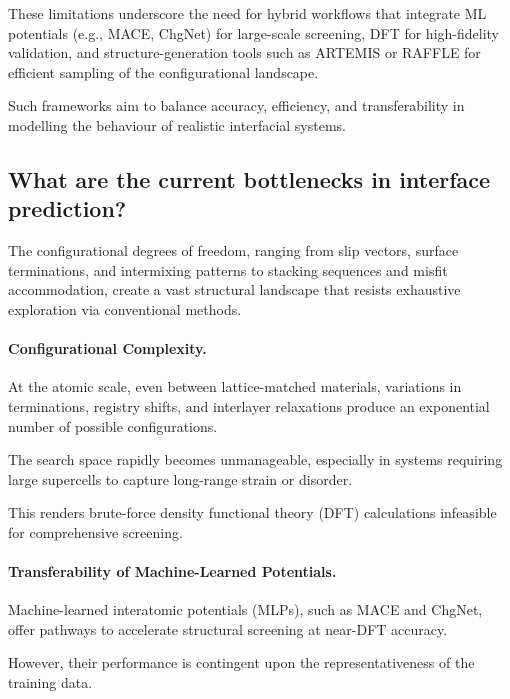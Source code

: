 
These limitations underscore the need for hybrid workflows that integrate ML potentials (e.g., MACE, ChgNet) for
large-scale screening, DFT for high-fidelity validation, and structure-generation tools such as ARTEMIS or RAFFLE for
efficient sampling of the configurational landscape.

Such frameworks aim to balance accuracy, efficiency, and transferability in modelling the behaviour of realistic
interfacial systems.


\subsection{What are the current bottlenecks in interface prediction?}


The configurational degrees of freedom, ranging from slip vectors, surface terminations, and intermixing patterns to
stacking sequences and misfit accommodation, create a vast structural landscape that resists exhaustive exploration via
conventional methods.


\paragraph{Configurational Complexity.} At the atomic scale, even between lattice-matched materials, variations in
terminations, registry shifts, and interlayer relaxations produce an exponential number of possible configurations.

The search space rapidly becomes unmanageable, especially in systems requiring large supercells to capture long-range
strain or disorder.

This renders brute-force density functional theory (DFT) calculations infeasible for comprehensive screening.


\paragraph{Transferability of Machine-Learned Potentials.} Machine-learned interatomic potentials (MLPs), such as MACE
and ChgNet, offer pathways to accelerate structural screening at near-DFT accuracy.

However, their performance is contingent upon the representativeness of the training data.

